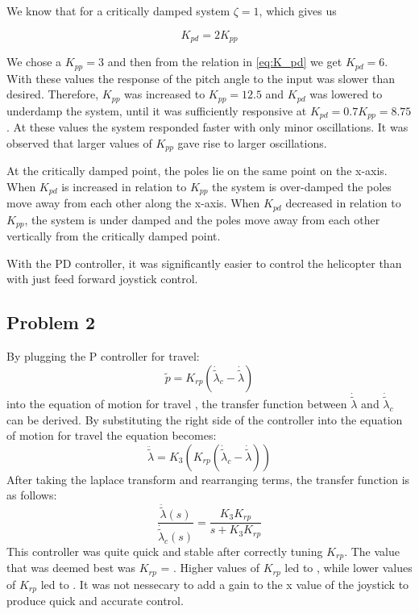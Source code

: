 We know that for a critically damped system $\zeta = 1$, which gives
us

\begin{equation}
  \label{eq:K_pd}
  K_{pd} = 2K_{pp}
\end{equation}

We chose a $K_{pp} = 3$ and then from the relation in \cref{eq:K_pd}
we get $K_{pd} = 6$. With these values the response of the pitch angle
to the input was slower than desired. Therefore, $K_{pp}$ was
increased to $K_{pp} = 12.5$ and $K_{pd}$ was lowered to underdamp the
system, until it  was sufficiently responsive at $K_{pd} = 0.7K_{pp} =
8.75$. At these values the system responded faster with only minor
oscillations. It was observed that larger values of $K_{pp}$ gave rise
to larger oscillations.


At the critically damped point, the poles lie on the same point on
the x-axis. When $K_{pd}$ is increased in relation to $K_{pp}$ the system is
over-damped the poles move away from each other along the x-axis.
When $K_{pd}$ decreased in relation to $K_{pp}$, the system is under damped
and the poles move away from each other vertically from the critically
damped point.

With the PD controller, it was significantly easier to control the
helicopter than with just feed forward joystick control.


\subsection{Problem 2}
By plugging the P controller for travel: 
\begin{equation}
	\tilde{p} = K_{rp}(\dot{\tilde{\lambda}}_c - \dot{\tilde{\lambda}})
\end{equation}
into the equation of motion for travel , the transfer function between $\dot{\tilde{\lambda}}$ and $\dot{\tilde{\lambda}}_c$  can be derived. By substituting the right side of the controller into the equation of motion for travel the equation becomes:
\begin{equation}
	\ddot{\tilde{\lambda}} = K_3(K_{rp}(\dot{\tilde{\lambda}}_c - \dot{\tilde{\lambda}}))
\end{equation}
After taking the laplace transform and rearranging terms, the transfer function is as follows:
\begin{equation}
	\frac{\ddot{\tilde{\lambda}}(s)}{\dot{\tilde{\lambda}}_c(s)} = \frac{K_3K_{rp}}{s + K_3K_{rp}}
\end{equation}
This controller was quite quick and stable after correctly tuning $K_{rp}$. The value that was deemed best was $K_{rp}$ = . Higher values of $K_{rp}$ led to , while lower values of $K_{rp}$ led to .  It was not nessecary to add a gain to the x value of the joystick to produce quick and accurate control.


